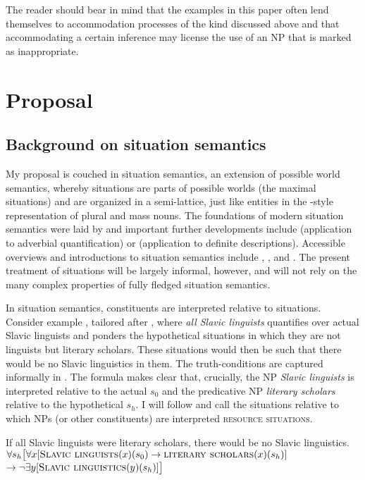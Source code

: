 \documentclass[output=paper,colorlinks,citecolor=brown,newtxmath]{langscibook}
\begin{document}
The reader should bear in mind that the examples in this paper often lend themselves to accommodation processes of the kind discussed above and that accommodating a certain inference may license the use of an NP that is marked as inappropriate.

\section{Proposal}\label{simik:sec:proposal}

\subsection{Background on situation semantics}

My proposal is couched in situation semantics, an extension of possible world semantics, whereby situations are parts of possible worlds (the maximal situations) and are organized in a semi-lattice, just like entities in the \citet{Link1983}-style representation of plural and mass nouns. The foundations of modern situation semantics were laid by \citet{Kratzer1989} and important further developments include \citet{vonFintel1994} (application to adverbial quantification) or \citet{Elbourne2005} (application to definite descriptions). Accessible overviews and introductions to situation semantics include \citet[chapter 3]{Schwarz2009}, \citet[chapter 2]{Elbourne2013}, and \citet{Kratzer2019}. The present treatment of situations will be largely informal, however, and will not rely on the many complex properties of fully fledged situation semantics.

In situation semantics, constituents are interpreted relative to situations. Consider example , tailored after \citet{Percus2000}, where \textit{all Slavic linguists} quantifies over actual Slavic linguists and ponders the hypothetical situations in which they are not linguists but literary scholars. These situations would then be such that there would be no Slavic linguistics in them. The truth-conditions are captured informally in . The formula makes clear that, crucially, the NP \textit{Slavic linguists} is interpreted relative to the actual $s_0$ and the predicative NP \textit{literary scholars} relative to the hypothetical $s_h$. I will follow \citet{Schwarz2009} and call the situations relative to which NPs (or other constituents) are interpreted \textsc{resource situations}.

\ea\ea If all Slavic linguists were literary scholars, there would be no Slavic linguistics.\label{simik:ex:percus}
\ex $\forall s_h\big[\forall x[\textsc{Slavic linguists}(x)(s_0)\rightarrow\textsc{literary scholars}(x)(s_h)]$\\
\xspace\hspace{0.5cm}$\rightarrow\neg\exists y[\textsc{Slavic linguistics}(y)(s_h)]\big]$\label{simik:ex:percus-tc}
\z\z
\end{document}
